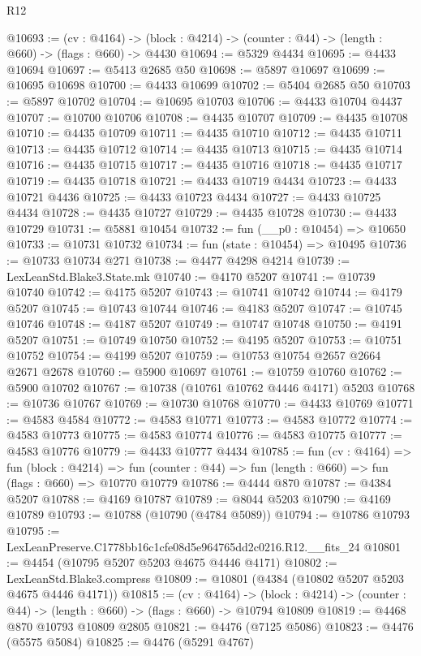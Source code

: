 \begin{lexlean}{R12}
\begin{coremodule}
@10693 := (cv : @4164) ->
  (block : @4214) -> (counter : @44) -> (length : @660) -> (flags : @660) -> @4430
@10694 := @5329 @4434
@10695 := @4433 @10694
@10697 := @5413 @2685 @50
@10698 := @5897 @10697
@10699 := @10695 @10698
@10700 := @4433 @10699
@10702 := @5404 @2685 @50
@10703 := @5897 @10702
@10704 := @10695 @10703
@10706 := @4433 @10704 @4437
@10707 := @10700 @10706
@10708 := @4435 @10707
@10709 := @4435 @10708
@10710 := @4435 @10709
@10711 := @4435 @10710
@10712 := @4435 @10711
@10713 := @4435 @10712
@10714 := @4435 @10713
@10715 := @4435 @10714
@10716 := @4435 @10715
@10717 := @4435 @10716
@10718 := @4435 @10717
@10719 := @4435 @10718
@10721 := @4433 @10719 @4434
@10723 := @4433 @10721 @4436
@10725 := @4433 @10723 @4434
@10727 := @4433 @10725 @4434
@10728 := @4435 @10727
@10729 := @4435 @10728
@10730 := @4433 @10729
@10731 := @5881 @10454
@10732 := fun (__p0 : @10454) => @10650
@10733 := @10731 @10732
@10734 := fun (state : @10454) => @10495
@10736 := @10733 @10734 @271
@10738 := @4477 @4298 @4214
@10739 := LexLeanStd.Blake3.State.mk
@10740 := @4170 @5207
@10741 := @10739 @10740
@10742 := @4175 @5207
@10743 := @10741 @10742
@10744 := @4179 @5207
@10745 := @10743 @10744
@10746 := @4183 @5207
@10747 := @10745 @10746
@10748 := @4187 @5207
@10749 := @10747 @10748
@10750 := @4191 @5207
@10751 := @10749 @10750
@10752 := @4195 @5207
@10753 := @10751 @10752
@10754 := @4199 @5207
@10759 := @10753 @10754 @2657 @2664 @2671 @2678
@10760 := @5900 @10697
@10761 := @10759 @10760
@10762 := @5900 @10702
@10767 := @10738 (@10761 @10762 @4446 @4171) @5203
@10768 := @10736 @10767
@10769 := @10730 @10768
@10770 := @4433 @10769
@10771 := @4583 @4584
@10772 := @4583 @10771
@10773 := @4583 @10772
@10774 := @4583 @10773
@10775 := @4583 @10774
@10776 := @4583 @10775
@10777 := @4583 @10776
@10779 := @4433 @10777 @4434
@10785 := fun (cv : @4164) =>
  fun (block : @4214) =>
  fun (counter : @44) => fun (length : @660) => fun (flags : @660) => @10770 @10779
@10786 := @4444 @870
@10787 := @4384 @5207
@10788 := @4169 @10787
@10789 := @8044 @5203
@10790 := @4169 @10789
@10793 := @10788 (@10790 (@4784 @5089))
@10794 := @10786 @10793
@10795 := LexLeanPreserve.C1778bb16c1cfe08d5e964765dd2c0216.R12.__fits_24
@10801 := @4454 (@10795 @5207 @5203 @4675 @4446 @4171)
@10802 := LexLeanStd.Blake3.compress
@10809 := @10801 (@4384 (@10802 @5207 @5203 @4675 @4446 @4171))
@10815 := (cv : @4164) ->
  (block : @4214) -> (counter : @44) -> (length : @660) -> (flags : @660) -> @10794 @10809
@10819 := @4468 @870 @10793 @10809 @2805
@10821 := @4476 (@7125 @5086)
@10823 := @4476 (@5575 @5084)
@10825 := @4476 (@5291 @4767)

\end{coremodule}
\end{lexlean}
